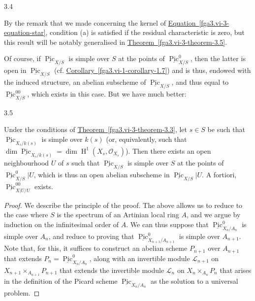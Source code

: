 \begin{remark}{3.4}
\begin{enumerate}
    \end{enumerate}\par{}By the remark that we made concerning the kernel of \hyperref[fga3.vi-3-equation-star]{Equation~\ref*{fga3.vi-3-equation-star}}, condition (a) is satisfied if the residual characteristic is zero, but this result will be notably generalised in \hyperref[fga3.vi-3-theorem-3.5]{Theorem~\ref*{fga3.vi-3-theorem-3.5}}.\par{}Of course, if \(\underline {\operatorname {Pic}}_{X/S}\) is simple over \(S\) at the points of \(\underline {\operatorname {Pic}}_{X/S}^0\), then the latter is open in \(\underline {\operatorname {Pic}}_{X/S}\) (cf. \hyperref[fga3.vi-1-corollary-1.7]{Corollary~\ref*{fga3.vi-1-corollary-1.7}}) and is thus, endowed with the induced structure, an abelian subscheme of \(\underline {\operatorname {Pic}}_{X/S}\), and thus equal to \(\underline {\operatorname {Pic}}_{X/S}^{00}\), which exists in this case.
    But we have much better:\end{remark}\begin{theorem}{3.5}\label{fga3.vi-3-theorem-3.5}\skipsinglepar\par{}Under the conditions of \hyperref[fga3.vi-3-theorem-3.3]{Theorem~\ref*{fga3.vi-3-theorem-3.3}}, let \(s\in  S\) be such that \(\underline {\operatorname {Pic}}_{X_s/k(s)}\) is simple over \(k(s)\) (or, equivalently, such that \(\dim \underline {\operatorname {Pic}}_{X_s/k(s)}=\dim \operatorname {H}^1(X_s,\mathcal {O}_{X_s})\)).
    Then there exists an open neighbourhood \(U\) of \(s\) such that \(\underline {\operatorname {Pic}}_{X/S}\) is simple over \(S\) at the points of \(\underline {\operatorname {Pic}}_{X/S}^0|U\), which is thus an open abelian subscheme in \(\underline {\operatorname {Pic}}_{X/S}|U\).
    A fortiori, \(\underline {\operatorname {Pic}}_{X|U/U}^{00}\) exists.\begin{proof}\par{}We describe the principle of the proof.
      The above allows us to reduce to the case where \(S\) is the spectrum of an Artinian local ring \(A\), and we argue by induction on the infinitesimal order of \(A\).
      We can thus suppose that \(\underline {\operatorname {Pic}}_{X_n/A_n}^0\) is simple over \(A_n\), and reduce to proving that \(\underline {\operatorname {Pic}}_{X_{n+1}/A_{n+1}}^0\) is simple over \(A_{n+1}\).
      Note that, for this, it suffices to construct an abelian scheme \(P_{n+1}\) over \(A_{n+1}\) that extends \(P_n=\underline {\operatorname {Pic}}_{X_n/A_n}^0\), along with an invertible module \(\mathscr {L}_{n+1}\) on \(X_{n+1}\times _{A_{n+1}}P_{n+1}\) that extends the invertible module \(\mathscr {L}_n\) on \(X_n\times _{A_n}P_n\) that arises in the definition of the Picard scheme \(\underline {\operatorname {Pic}}_{X_n/A_n}\) as the solution to a universal problem.

\end{proof}
\end{theorem}
